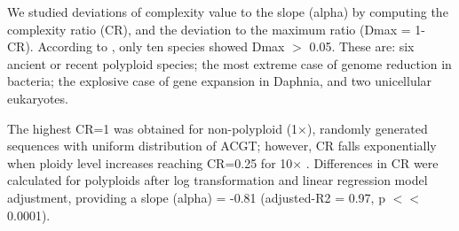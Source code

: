 \begin{table}[htbp]
{}
\caption[Genomes Complexity.]%
{{\bf Genomes Complexity.} \\Genomes size (GS), genomes complexity
  (GC), genome complexity ratio ($GCR=\frac{GC}{GS}$), and deviation
from the maximum GCR (Dmax=1-GCV) for 54 species of different
taxa. NCBI accession number or Ensembl ({\it E!}) version
(ACN-EV). {\bf \em Features}: {\bf AP}: Ancient Polyploid; {\bf DSD}: Double-Strand
DNA; {\bf EE}: Extreme Environment; {\bf GE}: Gene Expansion; {\bf IP}: Intracellular
Parasite; {\bf LBG}: Largest Bacterial Genome; {\bf LGS}: Largest Genome
Sequenced; {\bf RG}: Reduced Genome; {\bf RNA}: RNA Virus; {\bf RP}: Recent Polyploid;
{\bf SBG}: Shortest Bacterial Genome; {\bf SGS}: Shortest Genome Sequenced; {\bf SL}:
Synthetic Life; {\bf SSD}: Single-Strand DNA; {\bf UE}: Unicellular
Eukaryote. {\bf \em Notes}: -1-: 
}
\label{tab:genome}
\end{table}


We studied deviations of complexity value to the slope (alpha) by computing the complexity ratio (CR), and the deviation to the maximum ratio (Dmax = 1- CR). According to , only ten species showed Dmax $>$ 0.05. These are: six ancient or recent polyploid species; the most extreme case of genome reduction in bacteria; the explosive case of gene expansion in Daphnia, and two unicellular eukaryotes.

The highest CR=1 was obtained for non-polyploid (1$\times$), randomly generated sequences with uniform distribution of ACGT; however, CR falls exponentially when ploidy level increases reaching CR=0.25 for 10$\times$ . Differences in CR were calculated for polyploids after log transformation and linear regression model adjustment, providing a slope (alpha) = -0.81 (adjusted-R2 = 0.97, p $<<$ 0.0001). 

